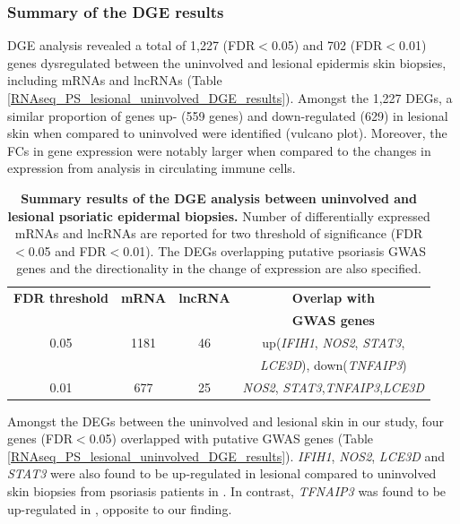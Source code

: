 \subsubsection{Summary of the DGE results}

DGE analysis  revealed a total of 1,227 (FDR$<$0.05) and 702 (FDR$<$0.01) genes dysregulated between the uninvolved and lesional epidermis skin biopsies, including mRNAs and lncRNAs (Table \ref{RNAseq_PS_lesional_uninvolved_DGE_results}). Amongst the 1,227 DEGs, a similar proportion of genes up- (559 genes) and down-regulated (629) in lesional skin when compared to uninvolved were identified (vulcano plot). Moreover, the FCs in gene expression were notably larger when compared to the changes in expression from analysis in circulating immune cells.  

\begin{table}[htbp]
\centering
\begin{tabular}{@{} c c c c}
\toprule
\textbf{FDR threshold}   & \textbf{mRNA}   & \textbf{lncRNA}  & \textbf{Overlap with}\\
                         &                 &                  & \textbf{GWAS genes}\\
\midrule
\midrule
0.05                     & 1181            & 46               &  up(\textit{IFIH1}, \textit{NOS2}, \textit{STAT3},\\ 
                         &                 &                  &  \textit{LCE3D}), down(\textit{TNFAIP3}) \\
0.01                     &  677            & 25               &  \textit{NOS2}, \textit{STAT3},\textit{TNFAIP3},\textit{LCE3D} \\
\bottomrule 
\end{tabular}
\medskip %
\caption[Summary results of the DGE analysis between uninvolved and lesional psoriatic epidermal biopsies.]{\textbf{Summary results of the DGE analysis between uninvolved and lesional psoriatic epidermal biopsies.} Number of differentially expressed mRNAs and lncRNAs are reported for two threshold of significance (FDR$<$0.05 and FDR$<$0.01). The DEGs overlapping putative psoriasis GWAS genes and the directionality in the change of expression are also specified.}
\label{tab:RNAseq_PS_lesional_uninvolved_DGE_results}
\end{table}
\bigskip %


Amongst the DEGs between the uninvolved and lesional skin in our study, four genes (FDR$<$0.05) overlapped with putative GWAS genes (Table \ref{RNAseq_PS_lesional_uninvolved_DGE_results}). \textit{IFIH1}, \textit{NOS2}, \textit{LCE3D} and \textit{STAT3} were also found to be up-regulated in lesional compared to uninvolved skin biopsies from psoriasis patients in \parencite{Tsoi2015}. In contrast, \textit{TFNAIP3} was found to be up-regulated in \parencite{Jabbari2011}, opposite to our finding.


